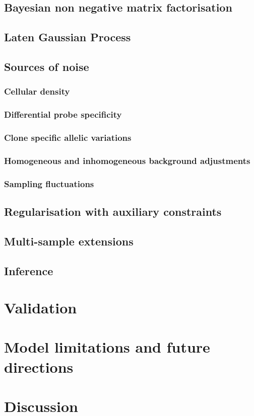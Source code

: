 \subsection{Bayesian non negative matrix factorisation}
\subsection{Laten Gaussian Process}
\subsection{Sources of noise}
\subsubsection*{Cellular density}
\subsubsection*{Differential probe specificity}
\subsubsection*{Clone specific allelic variations}
\subsubsection*{Homogeneous and inhomogeneous background adjustments}
\subsubsection*{Sampling fluctuations}

\subsection{Regularisation with auxiliary constraints}
\subsection{Multi-sample extensions}
\subsection{Inference}

\section{Validation}

\section{Model limitations and future directions}

\section{Discussion}


